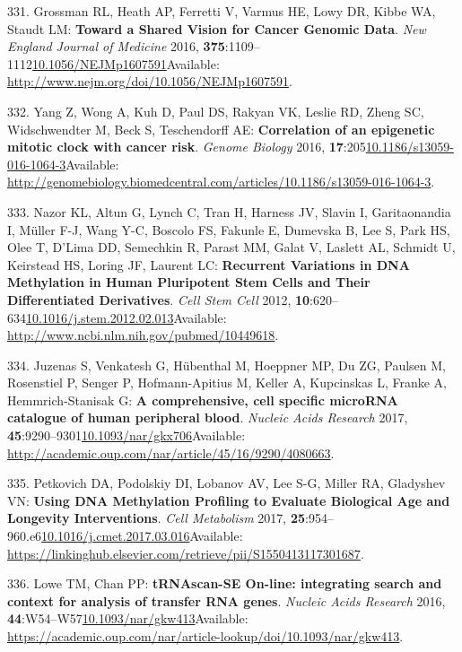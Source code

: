 \documentclass[
]{book}
\begin{document}
\leavevmode\hypertarget{ref-Grossman2016}{}%
331. Grossman RL, Heath AP, Ferretti V, Varmus HE, Lowy DR, Kibbe WA, Staudt LM: \textbf{Toward a Shared Vision for Cancer Genomic Data}. \emph{New England Journal of Medicine} 2016, \textbf{375}:1109--1112\href{https://doi.org/10.1056/NEJMp1607591}{10.1056/NEJMp1607591}Available: \url{http://www.nejm.org/doi/10.1056/NEJMp1607591}.

\leavevmode\hypertarget{ref-Yang2016}{}%
332. Yang Z, Wong A, Kuh D, Paul DS, Rakyan VK, Leslie RD, Zheng SC, Widschwendter M, Beck S, Teschendorff AE: \textbf{Correlation of an epigenetic mitotic clock with cancer risk}. \emph{Genome Biology} 2016, \textbf{17}:205\href{https://doi.org/10.1186/s13059-016-1064-3}{10.1186/s13059-016-1064-3}Available: \url{http://genomebiology.biomedcentral.com/articles/10.1186/s13059-016-1064-3}.

\leavevmode\hypertarget{ref-Nazor2012}{}%
333. Nazor KL, Altun G, Lynch C, Tran H, Harness JV, Slavin I, Garitaonandia I, Müller F-J, Wang Y-C, Boscolo FS, Fakunle E, Dumevska B, Lee S, Park HS, Olee T, D'Lima DD, Semechkin R, Parast MM, Galat V, Laslett AL, Schmidt U, Keirstead HS, Loring JF, Laurent LC: \textbf{Recurrent Variations in DNA Methylation in Human Pluripotent Stem Cells and Their Differentiated Derivatives}. \emph{Cell Stem Cell} 2012, \textbf{10}:620--634\href{https://doi.org/10.1016/j.stem.2012.02.013}{10.1016/j.stem.2012.02.013}Available: \url{http://www.ncbi.nlm.nih.gov/pubmed/10449618}.

\leavevmode\hypertarget{ref-Juzenas2017}{}%
334. Juzenas S, Venkatesh G, Hübenthal M, Hoeppner MP, Du ZG, Paulsen M, Rosenstiel P, Senger P, Hofmann-Apitius M, Keller A, Kupcinskas L, Franke A, Hemmrich-Stanisak G: \textbf{A comprehensive, cell specific microRNA catalogue of human peripheral blood}. \emph{Nucleic Acids Research} 2017, \textbf{45}:9290--9301\href{https://doi.org/10.1093/nar/gkx706}{10.1093/nar/gkx706}Available: \url{http://academic.oup.com/nar/article/45/16/9290/4080663}.

\leavevmode\hypertarget{ref-Petkovich2017}{}%
335. Petkovich DA, Podolskiy DI, Lobanov AV, Lee S-G, Miller RA, Gladyshev VN: \textbf{Using DNA Methylation Profiling to Evaluate Biological Age and Longevity Interventions}. \emph{Cell Metabolism} 2017, \textbf{25}:954--960.e6\href{https://doi.org/10.1016/j.cmet.2017.03.016}{10.1016/j.cmet.2017.03.016}Available: \url{https://linkinghub.elsevier.com/retrieve/pii/S1550413117301687}.

\leavevmode\hypertarget{ref-Lowe2016}{}%
336. Lowe TM, Chan PP: \textbf{tRNAscan-SE On-line: integrating search and context for analysis of transfer RNA genes}. \emph{Nucleic Acids Research} 2016, \textbf{44}:W54--W57\href{https://doi.org/10.1093/nar/gkw413}{10.1093/nar/gkw413}Available: \url{https://academic.oup.com/nar/article-lookup/doi/10.1093/nar/gkw413}.
\end{document}

